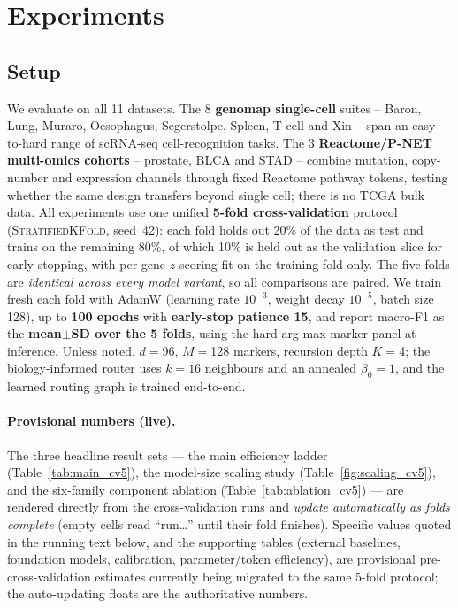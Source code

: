 \documentclass[letterpaper]{article}
\begin{document}
\section{Experiments}

\subsection{Setup}
We evaluate on all 11 datasets. The $8$ \textbf{genomap single-cell}
suites \cite{islam2023cartography} -- Baron, Lung, Muraro, Oesophagus, Segerstolpe,
Spleen, T-cell and Xin -- span an easy-to-hard range of scRNA-seq cell-recognition
tasks. The $3$ \textbf{Reactome/P-NET multi-omics cohorts} -- prostate, BLCA and
STAD -- combine mutation, copy-number and expression channels through fixed Reactome
pathway tokens, testing whether the same design transfers beyond single cell; there is no
TCGA bulk data. All experiments use one unified \textbf{5-fold cross-validation} protocol
(\textsc{StratifiedKFold}, seed~42): each fold holds out 20\% of the data as test and trains
on the remaining 80\%, of which 10\% is held out as the validation slice for early stopping,
with per-gene $z$-scoring fit on the training fold only. The five folds are \emph{identical
across every model variant}, so all comparisons are paired. We train fresh each fold with
AdamW (learning rate $10^{-3}$, weight decay $10^{-5}$, batch size 128), up to
\textbf{100 epochs} with \textbf{early-stop patience 15}, and report macro-F1 as the
\textbf{mean$\pm$SD over the 5 folds}, using the hard arg-max marker panel at inference.
Unless noted, $d{=}$96, $M{=}$128 markers, recursion depth $K{=}$4; the biology-informed
router uses $k{=}16$ neighbours and an annealed $\beta_0{=}1$, and the learned routing graph
is trained end-to-end.

\paragraph{Provisional numbers (live).} The three headline result sets --- the main
efficiency ladder (Table~\ref{tab:main_cv5}), the model-size scaling study
(Table~\ref{fig:scaling_cv5}), and the six-family component ablation
(Table~\ref{tab:ablation_cv5}) --- are rendered directly from the cross-validation runs and
\emph{update automatically as folds complete} (empty cells read ``run\ldots'' until their
fold finishes). Specific values quoted in the running text below, and the supporting tables
(external baselines, foundation models, calibration, parameter/token efficiency), are
provisional pre-cross-validation estimates currently being migrated to the same 5-fold
protocol; the auto-updating floats are the authoritative numbers.
\end{document}
